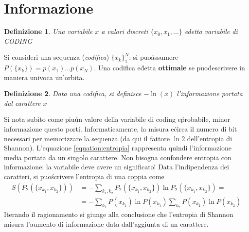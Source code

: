 \documentclass[12pt, a4paper]{book}
\theoremstyle{theorem}
\newtheorem{definition}{Definizione}[section]
\begin{document}
		\section{Informazione}
			\begin{definition}
				Una variabile $x$ a valori discreti $\{x_0,x_1,...\}$ e\' detta variabile di CODING
			\end{definition}
			Si consideri una sequenza (\textit{codifica}) $\{x_k\}_1^N$: si puo\' assumere $P(\{x_k\})=p(x_1)...p(x_N)$.
			Una codifica e\' detta \textbf{ottimale} se puo\' descrivere in maniera univoca un'orbita.
			\begin{definition}
				Data una codifica, si definisce $-\ln(x)$ l'informazione portata dal carattere $x$
			\end{definition}
			Si nota subito come piu\' un valore della variabile di coding e\' probabile, minor informazione questo porti.
			Informaticamente, la misura e\' circa il numero di bit necessari per memorizzare la sequenza (da qui il fattore $\ln2$ dell'entropia di Shannon).
			L'equazione \ref{equation:entropia} rappresenta quindi l'informazione media portata da un singolo carattere.
			Non bisogna confondere entropia con informazione: la variabile deve avere un significato!
			Data l'indipendenza dei caratteri, si puo\' scrivere l'entropia di una coppia come
			\begin{equation*}
				\begin{split}
					S\left(P_{2}\left(\{x_{k_{1}},x_{k_{2}}\}\right)\right)&=-\sum_{k_{1},k_{2}}P_{2}\left(\{x_{k_{1}},x_{k_{2}}\}\right)\ln{P_{2}\left(\{x_{k_{1}},x_{k_{2}}\}\right)}=\\
					&=-\sum_{k_{1}}P\left(x_{k_{1}}\right)\ln{P\left(x_{k_{1}}\right)}\sum_{k_{2}}P\left(x_{k_{2}}\right)\ln{P\left(x_{k_{2}}\right)}
				\end{split}
			\end{equation*}
			Iterando il ragionamento si giunge alla conclusione che l'entropia di Shannon misura l'aumento di informazione data dall'aggiunta di un carattere.
\end{document}
